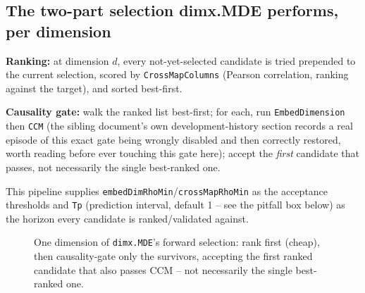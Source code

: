 \documentclass[11pt]{article}
\begin{document}
\subsection{The two-part selection dimx.MDE performs, per dimension}
\begin{steps}
\item \textbf{Ranking:} at dimension $d$, every not-yet-selected candidate is tried prepended to the current selection, scored by \texttt{CrossMapColumns} (Pearson correlation, ranking against the target), and sorted best-first.
\item \textbf{Causality gate:} walk the ranked list best-first; for each, run \texttt{EmbedDimension} then \texttt{CCM} (the sibling document's own development-history section records a real episode of this exact gate being wrongly disabled and then correctly restored, worth reading before ever touching this gate here); accept the \emph{first} candidate that passes, not necessarily the single best-ranked one.
\end{steps}
This pipeline supplies \texttt{embedDimRhoMin}/\texttt{crossMapRhoMin} as the acceptance thresholds and \texttt{Tp} (prediction interval, default 1 -- see the pitfall box below) as the horizon every candidate is ranked/validated against.

\begin{figure}[H]
\centering
{}
\caption{One dimension of \texttt{dimx.MDE}'s forward selection: rank first (cheap), then causality-gate only the survivors, accepting the first ranked candidate that also passes CCM -- not necessarily the single best-ranked one.}
\label{fig:mde-flow}
\end{figure}
\end{document}
